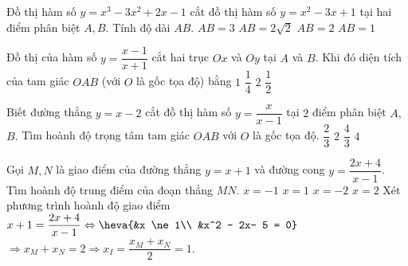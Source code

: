 \begin{ex}
	Đồ thị hàm số $y=x^3-3x^2+2x-1$ cắt đồ thị hàm số $y=x^2-3x+1$ tại hai điểm phân biệt $A,B$. Tính độ dài $AB$.
	\choice
	{$AB=3$}
	{$AB=2\sqrt2$}
	{$AB=2$}
	{\True $AB=1$}
\end{ex}

\begin{ex}
	Đồ thị của hàm số $ y = \dfrac{x - 1}{x+1} $ cắt hai trục $ Ox $ và $ Oy $ tại $ A $ và $ B $. Khi đó diện tích của tam giác $ OAB $ (với $ O $ là gốc tọa độ) bằng
	\choice
	{$ 1 $}
	{$ \dfrac{1}{4} $}
	{$ 2 $}
	{\True $ \dfrac{1}{2} $}
\end{ex}

\begin{ex}
	Biết đường thẳng $y=x-2$ cắt đồ thị hàm số $ y=\dfrac{x}{x-1} $ tại $ 2 $ điểm phân biệt $ A, $ $ B. $ Tìm hoành độ trọng tâm tam giác $OAB$ với $O$ là gốc tọa độ.
	\choice
	{$ \dfrac{2}{3} $}
	{$ 2 $}
	{\True $ \dfrac{4}{3} $}
	{$ 4 $}
\end{ex}

\begin{ex}%
	Gọi $ M, N $ là giao điểm của đường thẳng $ y = x + 1 $ và đường cong $ y = \dfrac{2x+4}{x-1} $. Tìm hoành độ trung điểm của đoạn thẳng $ MN. $
	\choice
	{$ x = -1 $}
	{\True $ x = 1 $}
	{$ x = -2 $}
	{ $ x = 2$}
	\loigiai
	{Xét phương trình hoành độ giao điểm $ x+ 1 = \dfrac{2x +4}{x-1} \Leftrightarrow \heva{&x \ne 1\\ &x^2 - 2x- 5 = 0}$\\
		$ \Rightarrow x_M + x_N = 2 \Rightarrow x_I = \dfrac{x_M+x_N}{2} = 1.$}
\end{ex}

